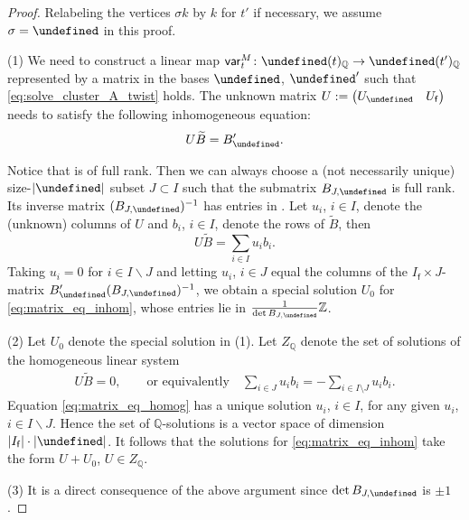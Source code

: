 \documentclass[10pt,a4paper]{amsart}
\newcommand{\Z}{\mathbb{Z}}
\newcommand{\Q}{\mathbb{Q}}
\renewcommand{\tilde}[1]{\widetilde{#1}}
\newcommand{\opname}[1]{\operatorname{\mathsf{#1}}}
\newcommand{\tB}{{\widetilde{B}}}
\newcommand{\var}{\opname{var}}
\newcommand{\fv}{\opname{f}}
\newcommand{\ufv}{\opname{uf}}
\let\Mc\undefined
\let\Iufv\undefined
\let\Id\undefined
\let\ff\undefined
\let\uff\undefined
\let\low\undefined
\newcommand{\Mc}{M^\circ}
\newcommand{\Iufv}{I_{\ufv}}
\newcommand{\Id}{{\opname{Id}}}
\newcommand{\ff}{\mathbf{f}}
\newcommand{\uff}{\underline{\ff}}
\newcommand{\low}{\opname{\fv,\ufv}}
\numberwithin{equation}{section}
\begin{document}
\begin{proof}
Relabeling the vertices $\sigma k$ by $k$ for $t'$ if necessary,
we assume $\sigma=\Id$ in this proof.

(1) We need to construct a linear map $\var_{t}^{M}\colon\Mc(t)_{\Q}\rightarrow\Mc(t')_{\Q}$
represented by a matrix \smash{$\left(\begin{smallmatrix}
\Id_{\ufv} & 0\\
U_{\low} & U_{\fv}
\end{smallmatrix}\right)$} in the bases $\uff$, $\uff'$ such that \eqref{eq:solve_cluster_A_twist}
holds. The unknown matrix $U:=\begin{pmatrix}
U_{\low} & U_{\fv}\end{pmatrix}$ needs to satisfy the following inhomogeneous equation:
\begin{gather}
U\tB = B'_{\low} \label{eq:matrix_eq_inhom}.
\end{gather}

Notice that \smash{$\tB=\left(\begin{smallmatrix}
B_{\ufv}\\
B_{\low}
\end{smallmatrix}\right)$} is of full rank. Then we can always choose a (not necessarily unique)
size-$|\Iufv|$ subset $J\subset I$ such that the submatrix $B_{J,\Iufv}$
is full rank. Its inverse matrix $(B_{J,\Iufv})^{-1}$ has entries
in
\smash{$\frac{1}{\det B_{J,\Iufv}}\Z$}.
Let $u_i$, $i\in I$, denote the (unknown) columns of $U$ and $b_i$, $i\in I$, denote the rows of $\tilde{B}$, then
\[U\tilde{B}=\sum_{i\in I}u_ib_i.\]
Taking $u_i=0$ for $i\in I\backslash J$ and letting $u_i$, $i\in J$ equal the columns of the $I_{\fv}\times J$-matrix $B'_{\low}(B_{J,\Iufv})^{-1}$, we obtain a special solution $U_0$ for \eqref{eq:matrix_eq_inhom}, whose entries lie in $\frac{1}{\det B_{J,\Iufv}}\Z$.

(2) Let $U_{0}$ denote the special solution in (1). Let $Z_{\Q}$ denote
the set of solutions of the homogeneous linear system
\begin{gather}\label{eq:matrix_eq_homog}
U\tB=0, \qquad \text{or equivalently}\quad\sum_{i\in J}u_ib_i=-\sum_{i\in I\setminus J}u_ib_i.
\end{gather}
Equation \eqref{eq:matrix_eq_homog} has a unique solution $u_i$, $i\in I$, for any given $u_i$, $i\in I\backslash J$. Hence the set of $\Q$-solutions is a vector space of dimension $|I_{\fv}|\cdot|\Iufv|$.
It follows that the solutions for \eqref{eq:matrix_eq_inhom} take
the form $U+U_{0}$, $U\in Z_{\Q}$.

(3) It is a direct consequence of the above argument since $\det B_{J,\Iufv}$ is $\pm 1$.
\end{proof}
\end{document}
